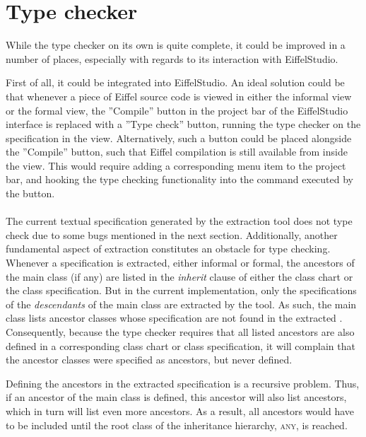 \section{Type checker}
While the type checker on its own is quite complete, it could be improved in a number of places, especially with regards to its interaction with EiffelStudio.

First of all, it could be integrated into EiffelStudio. An ideal solution could be that whenever a piece of Eiffel source code is viewed in either the informal \bon{} view or the formal \bon{} view, the ''Compile'' button in the project bar of the EiffelStudio interface is replaced with a ''Type check'' button, running the type checker on the specification in the view. Alternatively, such a button could be placed alongside the ''Compile'' button, such that Eiffel compilation is still available from inside the \bon{} view. This would require adding a corresponding menu item to the project bar, and hooking the type checking functionality into the command executed by the button.

\paragraph{}
The current textual \bon{} specification generated by the extraction tool does not type check due to some bugs mentioned in the next section. Additionally, another fundamental aspect of extraction constitutes an obstacle for type checking. Whenever a specification is extracted, either informal or formal, the ancestors of the main class (if any) are listed in the \textit{inherit} clause of either the class chart or the class specification. But in the current implementation, only the specifications of the \emph{descendants} of the main class are extracted by the tool. As such, the main class lists ancestor classes whose specification are not found in the extracted \bon{}. Consequently, because the type checker requires that all listed ancestors are also defined in a corresponding class chart or class specification, it will complain that the ancestor classes were specified as ancestors, but never defined.

Defining the ancestors in the extracted specification is a recursive problem. Thus, if an ancestor of the main class is defined, this ancestor will also list ancestors, which in turn will list even more ancestors. As a result, all ancestors would have to be included until the root class of the inheritance hierarchy, \textsc{any}, is reached. 
